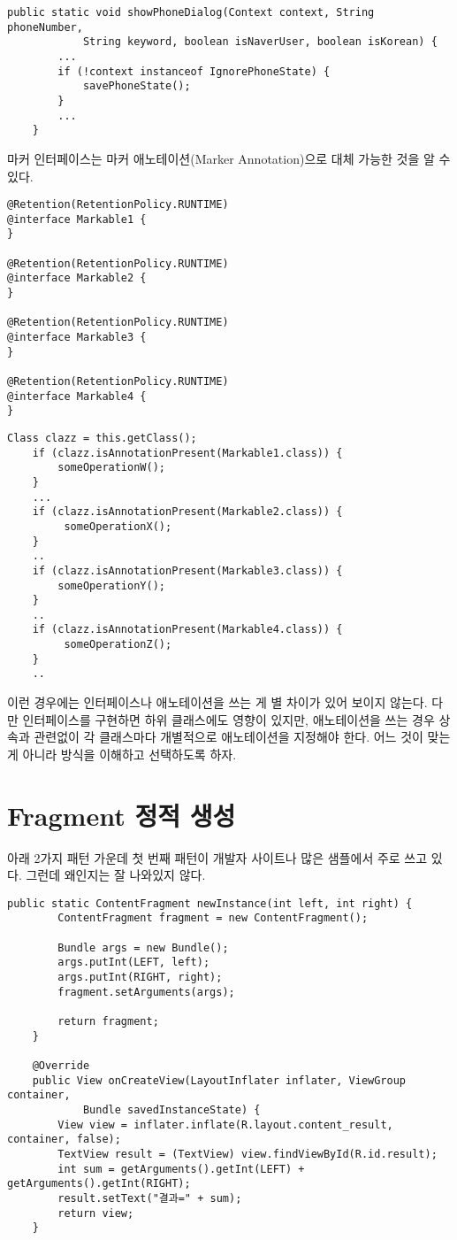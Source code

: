 \begin{lstlisting}[frame=single]
	public static void showPhoneDialog(Context context, String phoneNumber, 
			String keyword, boolean isNaverUser, boolean isKorean) {
		...
		if (!context instanceof IgnorePhoneState) {
			savePhoneState();
		}
		...
	}
\end{lstlisting}	
	
마커 인터페이스는 마커 애노테이션(Marker Annotation)으로 대체 가능한 것을 알 수 있다.

\begin{lstlisting}[frame=single]
@Retention(RetentionPolicy.RUNTIME)
@interface Markable1 {
}

@Retention(RetentionPolicy.RUNTIME)
@interface Markable2 {
}

@Retention(RetentionPolicy.RUNTIME)
@interface Markable3 {
}

@Retention(RetentionPolicy.RUNTIME)
@interface Markable4 {
}
\end{lstlisting}

\begin{lstlisting}[frame=single]
	Class clazz = this.getClass();
	if (clazz.isAnnotationPresent(Markable1.class)) {
		someOperationW();	
	}
 	...
	if (clazz.isAnnotationPresent(Markable2.class)) {
		 someOperationX();
	}
	..
	if (clazz.isAnnotationPresent(Markable3.class)) {
		someOperationY();
	} 
	..
	if (clazz.isAnnotationPresent(Markable4.class)) {
		 someOperationZ();
	}
	..
\end{lstlisting}

이런 경우에는 인터페이스나 애노테이션을 쓰는 게 별 차이가 있어 보이지 않는다. 다만 인터페이스를 구현하면 하위 클래스에도 영향이 있지만, 애노테이션을 쓰는 경우 상속과 관련없이 각 클래스마다 개별적으로 애노테이션을 지정해야 한다. 어느 것이 맞는 게 아니라 방식을 이해하고 선택하도록 하자.

\section{Fragment 정적 생성}
아래 2가지 패턴 가운데 첫 번째 패턴이 개발자 사이트나 많은 샘플에서 주로 쓰고 있다. 그런데 왜인지는 잘 나와있지 않다.
\begin{lstlisting}[frame=single]
   public static ContentFragment newInstance(int left, int right) {
        ContentFragment fragment = new ContentFragment();

        Bundle args = new Bundle();
        args.putInt(LEFT, left);
        args.putInt(RIGHT, right);
        fragment.setArguments(args);

        return fragment;
    }

    @Override
    public View onCreateView(LayoutInflater inflater, ViewGroup container, 
    		Bundle savedInstanceState) {
        View view = inflater.inflate(R.layout.content_result, container, false);
        TextView result = (TextView) view.findViewById(R.id.result);
        int sum = getArguments().getInt(LEFT) + getArguments().getInt(RIGHT);
        result.setText("결과=" + sum);
        return view;
    }
\end{lstlisting}

